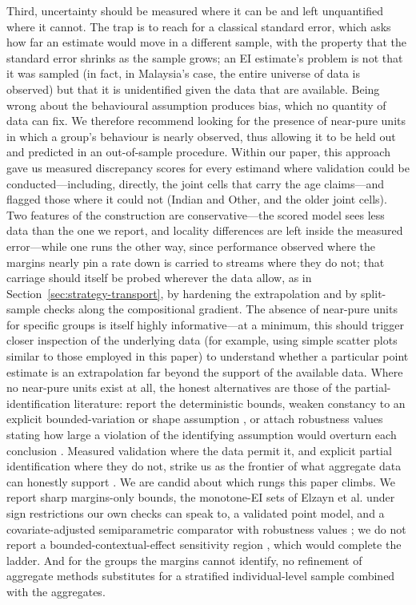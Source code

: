 \documentclass[11pt]{article}
\begin{document}
Third, uncertainty should be measured where it can be and left unquantified where it cannot. The trap is to reach for a classical standard error, which asks how far an estimate would move in a different sample, with the property that the standard error shrinks as the sample grows; an EI estimate's problem is not that it was sampled (in fact, in Malaysia's case, the entire universe of data is observed) but that it is unidentified given the data that are available. Being wrong about the behavioural assumption produces bias, which no quantity of data can fix. We therefore recommend looking for the presence of near-pure units in which a group's behaviour is nearly observed, thus allowing it to be held out and predicted in an out-of-sample procedure. Within our paper, this approach gave us measured discrepancy scores for every estimand where validation could be conducted---including, directly, the joint cells that carry the age claims---and flagged those where it could not (Indian and Other, and the older joint cells). Two features of the construction are conservative---the scored model sees less data than the one we report, and locality differences are left inside the measured error---while one runs the other way, since performance observed where the margins nearly pin a rate down is carried to streams where they do not; that carriage should itself be probed wherever the data allow, as in Section~\ref{sec:strategy-transport}, by hardening the extrapolation and by split-sample checks along the compositional gradient. The absence of near-pure units for specific groups is itself highly informative---at a minimum, this should trigger closer inspection of the underlying data (for example, using simple scatter plots similar to those employed in this paper) to understand whether a particular point estimate is an extrapolation far beyond the support of the available data. Where no near-pure units exist at all, the honest alternatives are those of the partial-identification literature: report the deterministic bounds, weaken constancy to an explicit bounded-variation or shape assumption \cite{manski1995,manski2018,manskipepper2018,jiangking2020}, or attach robustness values stating how large a violation of the identifying assumption would overturn each conclusion \cite{mccartankuriwaki2025}. Measured validation where the data permit it, and explicit partial identification where they do not, strike us as the frontier of what aggregate data can honestly support \cite{chomanski2008}. We are candid about which rungs this paper climbs. We report sharp margins-only bounds, the monotone-EI sets of Elzayn et al.\cite{elzayn2026} under sign restrictions our own checks can speak to, a validated point model, and a covariate-adjusted semiparametric comparator with robustness values \cite{mccartankuriwaki2025}; we do not report a bounded-contextual-effect sensitivity region \cite{jiangking2020,manski2018}, which would complete the ladder. And for the groups the margins cannot identify, no refinement of aggregate methods substitutes for a stratified individual-level sample combined with the aggregates.
\end{document}
